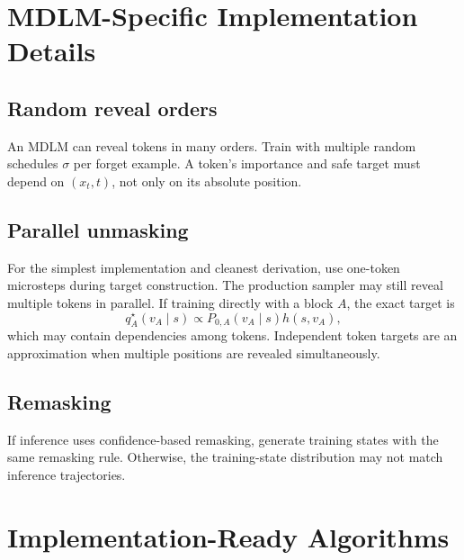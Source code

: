 \documentclass[10pt]{article}
\newcommand{\1}{\mathbb{I}}
\begin{document}
\section{MDLM-Specific Implementation Details}

\subsection{Random reveal orders}

An MDLM can reveal tokens in many orders. Train with multiple random schedules $\sigma$ per forget example. A token's importance and safe target must depend on $(x_t,t)$, not only on its absolute position.

\subsection{Parallel unmasking}

For the simplest implementation and cleanest derivation, use one-token microsteps during target construction. The production sampler may still reveal multiple tokens in parallel. If training directly with a block $A$, the exact target is
\begin{equation}
q_A^\star(v_A\mid s)
\propto
P_{0,A}(v_A\mid s)h(s,v_A),
\end{equation}
which may contain dependencies among tokens. Independent token targets are an approximation when multiple positions are revealed simultaneously.

\subsection{Remasking}

If inference uses confidence-based remasking, generate training states with the same remasking rule. Otherwise, the training-state distribution may not match inference trajectories.

\section{Implementation-Ready Algorithms}
\end{document}
